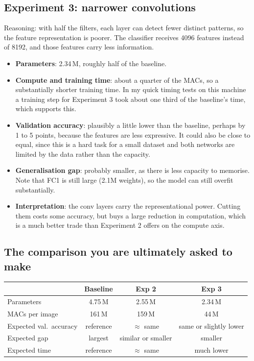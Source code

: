 \documentclass[11pt]{article}
\newcommand{\key}[1]{\textbf{#1}}
\begin{document}
\subsection{Experiment 3: narrower convolutions}

Reasoning: with half the filters, each layer can detect fewer distinct patterns, so the feature representation is poorer. The classifier receives 4096 features instead of 8192, and those features carry less information.

\begin{itemize}[noitemsep]
\item \key{Parameters}: 2.34\,M, roughly half of the baseline.
\item \key{Compute and training time}: about a quarter of the MACs, so a substantially shorter training time. In my quick timing tests on this machine a training step for Experiment 3 took about one third of the baseline's time, which supports this.
\item \key{Validation accuracy}: plausibly a little lower than the baseline, perhaps by 1 to 5 points, because the features are less expressive. It could also be close to equal, since this is a hard task for a small dataset and both networks are limited by the data rather than the capacity.
\item \key{Generalisation gap}: probably smaller, as there is less capacity to memorise. Note that FC1 is still large (2.1M weights), so the model can still overfit substantially.
\item \key{Interpretation}: the conv layers carry the representational power. Cutting them costs some accuracy, but buys a large reduction in computation, which is a much better trade than Experiment 2 offers on the compute axis.
\end{itemize}

\subsection{The comparison you are ultimately asked to make}

\begin{center}
\begin{tabular}{lccc}
\toprule
 & Baseline & Exp 2 & Exp 3 \\
\midrule
Parameters & 4.75\,M & 2.55\,M & 2.34\,M \\
MACs per image & 161\,M & 159\,M & 44\,M \\
Expected val.\ accuracy & reference & $\approx$ same & same or slightly lower \\
Expected gap & largest & similar or smaller & smaller \\
Expected time & reference & $\approx$ same & much lower \\
\bottomrule
\end{tabular}
\end{center}
\end{document}

